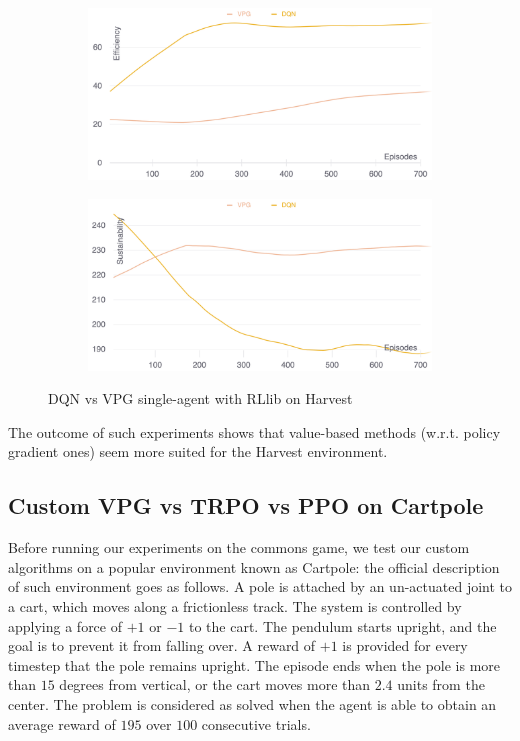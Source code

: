 \documentclass{article}
\begin{document}
\begin{figure}
  \centering
  \begin{subfigure}[b]{0.45\textwidth}
    \centering
    \includegraphics[width=\textwidth]{../assets/dqn-vpg-rllib-single-efficiency}
  \end{subfigure}
  \hfill
  \begin{subfigure}[b]{0.45\textwidth}
    \centering
    \includegraphics[width=\textwidth]{../assets/dqn-vpg-rllib-single-sustainability}
  \end{subfigure}
  \caption{DQN vs VPG single-agent with RLlib on Harvest}
  \label{fig:dqn-vs-vpg-rllib}
\end{figure}

The outcome of such experiments shows that value-based methods (w.r.t. policy gradient ones) seem more suited for the Harvest environment.

\subsection{Custom VPG vs TRPO vs PPO on Cartpole}
Before running our experiments on the commons game, we test our custom algorithms on a popular environment known as Cartpole: the official description of such environment goes as follows. A pole is attached by an un-actuated joint to a cart, which moves along a frictionless track. The system is controlled by applying a force of $+1$ or $-1$ to the cart. The pendulum starts upright, and the goal is to prevent it from falling over. A reward of $+1$ is provided for every timestep that the pole remains upright. The episode ends when the pole is more than $15$ degrees from vertical, or the cart moves more than $2.4$ units from the center. The problem is considered as solved when the agent is able to obtain an average reward of $195$ over $100$ consecutive trials.
\end{document}
